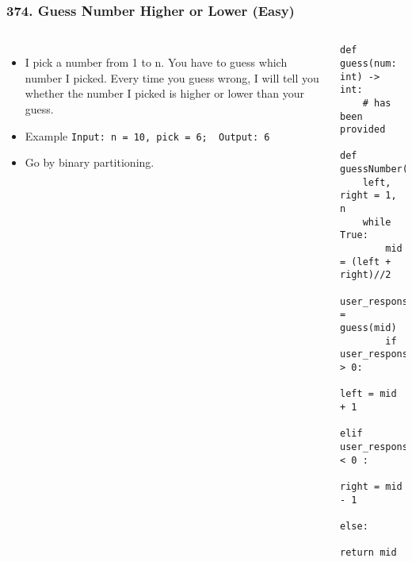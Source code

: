 \begin{frame}[fragile]\frametitle{374. Guess Number Higher or Lower (Easy)}

	\begin{columns}[T]
	\begin{itemize}
	\item I pick a number from 1 to n. You have to guess which number I picked. Every time you guess wrong, I will tell you whether the number I picked is higher or lower than your guess.
	\item Example \lstinline|Input: n = 10, pick = 6;  Output: 6|
	\item Go by binary partitioning.
	\end{itemize}
		\begin{lstlisting}[basicstyle=\scriptsize]
def guess(num: int) -> int:
	# has been provided
	
def guessNumber(n):
    left, right = 1, n
    while True:
        mid = (left + right)//2
        user_response = guess(mid)
        if user_response > 0:
            left = mid + 1
        elif user_response < 0 :
            right = mid - 1
        else:
            return mid
				\end{lstlisting}		
	\end{columns}
	
	
\end{frame}
